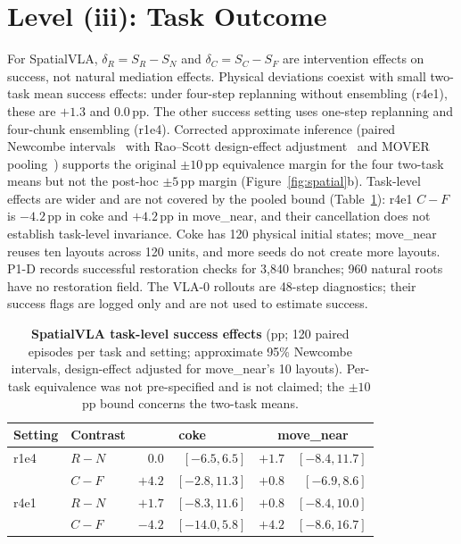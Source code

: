\section{Level (iii): Task Outcome}
\label{sec:outcome}
For SpatialVLA, $\delta_R=S_R-S_N$ and $\delta_C=S_C-S_F$ are intervention effects on success, not natural mediation effects. Physical deviations coexist with small two-task mean success effects: under four-step replanning without ensembling (r4e1), these are $+1.3$ and $0.0$\,pp. The other success setting uses one-step replanning and four-chunk ensembling (r1e4). Corrected approximate inference (paired Newcombe intervals~\cite{newcombe1998paired} with Rao--Scott design-effect adjustment~\cite{raoscott1992clustered} and MOVER pooling~\cite{zou2008mover}) supports the original $\pm10$\,pp equivalence margin for the four two-task means but not the post-hoc $\pm5$\,pp margin (Figure~\ref{fig:spatial}b). Task-level effects are wider and are not covered by the pooled bound (Table~\ref{tab:spatial8}): r4e1 $C-F$ is $-4.2$\,pp in coke and $+4.2$\,pp in move\_near, and their cancellation does not establish task-level invariance. Coke has 120 physical initial states; move\_near reuses ten layouts across 120 units, and more seeds do not create more layouts. P1-D records successful restoration checks for 3,840 branches; 960 natural roots have no restoration field. The VLA-0 rollouts are 48-step diagnostics; their success flags are logged only and are not used to estimate success.



\begin{table}[t]
\centering\small
\caption{\textbf{SpatialVLA task-level success effects} (pp; 120 paired episodes per task and setting; approximate 95\% Newcombe intervals, design-effect adjusted for move\_near's 10 layouts). Per-task equivalence was not pre-specified and is not claimed; the $\pm10$\,pp bound concerns the two-task means.}
\label{tab:spatial8}
\setlength{\tabcolsep}{3pt}
\begin{tabular}{@{}llrrrr@{}}\toprule
Setting & Contrast & \multicolumn{2}{c}{coke} & \multicolumn{2}{c}{move\_near}\\\midrule
r1e4 & $R-N$ & $0.0$ & $[-6.5,6.5]$ & $+1.7$ & $[-8.4,11.7]$\\
 & $C-F$ & $+4.2$ & $[-2.8,11.3]$ & $+0.8$ & $[-6.9,8.6]$\\
r4e1 & $R-N$ & $+1.7$ & $[-8.3,11.6]$ & $+0.8$ & $[-8.4,10.0]$\\
 & $C-F$ & $-4.2$ & $[-14.0,5.8]$ & $+4.2$ & $[-8.6,16.7]$\\\bottomrule
\end{tabular}
\end{table}

